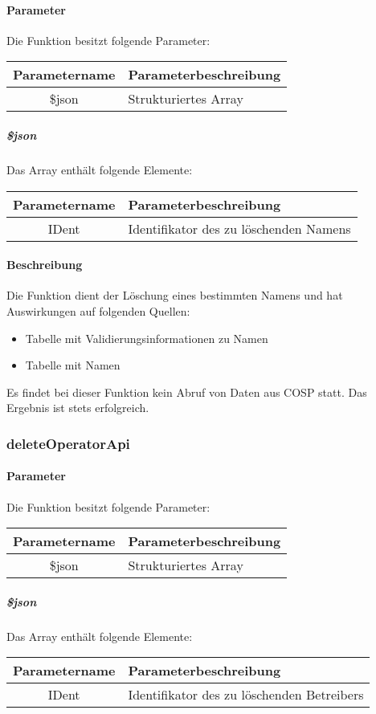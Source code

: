 \paragraph{Parameter} Die Funktion besitzt folgende Parameter:
\begin{table}[H]
	\begin{tabular}{|c|p{11cm}|}
		\hline
		\textbf{Parametername} & \textbf{Parameterbeschreibung} \\ \hline
		\$json & Strukturiertes Array \\ \hline
	\end{tabular}
\end{table}
\subparagraph{\$json}Das Array enthält folgende Elemente:
\begin{table}[H]
	\begin{tabular}{|c|p{11cm}|}
		\hline
		\textbf{Parametername} & \textbf{Parameterbeschreibung} \\ \hline
		IDent & Identifikator des zu löschenden Namens \\ \hline
	\end{tabular}
\end{table}
\paragraph{Beschreibung} Die Funktion dient der Löschung eines bestimmten Namens und hat Auswirkungen auf folgenden Quellen:
\begin{itemize}
	\item Tabelle mit Validierungsinformationen zu Namen
	\item Tabelle mit Namen
\end{itemize}
Es findet bei dieser Funktion kein Abruf von Daten aus {\glqq COSP\grqq} statt. Das Ergebnis ist stets erfolgreich.
\subsubsection{deleteOperatorApi}
\paragraph{Parameter} Die Funktion besitzt folgende Parameter:
\begin{table}[H]
	\begin{tabular}{|c|p{11cm}|}
		\hline
		\textbf{Parametername} & \textbf{Parameterbeschreibung} \\ \hline
		\$json & Strukturiertes Array \\ \hline
	\end{tabular}
\end{table}
\subparagraph{\$json}Das Array enthält folgende Elemente:
\begin{table}[H]
	\begin{tabular}{|c|p{11cm}|}
		\hline
		\textbf{Parametername} & \textbf{Parameterbeschreibung} \\ \hline
		IDent & Identifikator des zu löschenden Betreibers \\ \hline
	\end{tabular}
\end{table}
